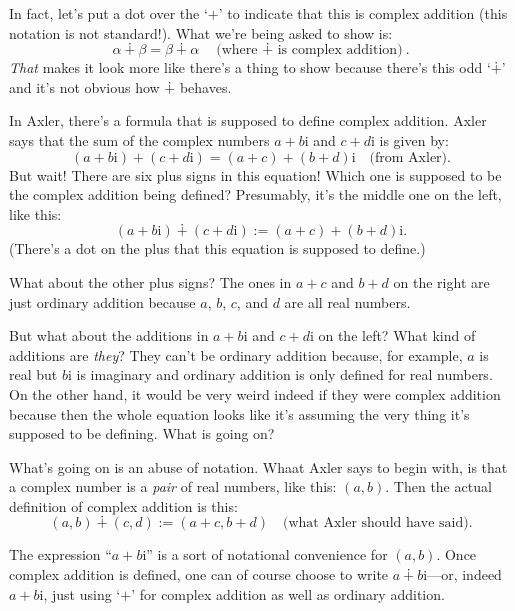 \documentclass[10pt, a4paper, twocolumn]{article}
\newcommand{\ii}{\mathrm{i}}
\begin{document}
In fact, let's put a dot over the `$+$' to indicate that this is complex
addition (this notation is not standard!). What we're being asked to show is:
\begin{equation*}
  \alpha \dotplus \beta = \beta \dotplus \alpha \quad\text{(where $\dotplus$ is complex addition)}.
\end{equation*}
\emph{That} makes it look more like there's a thing to show because there's this odd `$\dotplus$' and it's not obvious how $\dotplus$ behaves.

In Axler, there's a formula that is supposed to define complex addition. Axler says that the sum of the complex numbers $a+b\ii$ and $c+d\ii$ is given by:
\begin{equation*}
  (a + b\ii) + (c + d\ii) = (a+c) + (b+d)\ii \quad\text{(from Axler)}.
\end{equation*}
But wait! There are six plus signs in this equation! Which one is supposed to be the complex addition being defined? Presumably, it's the middle one on the left, like this:
\begin{equation*}
  (a + b\ii) \dotplus (c + d\ii) := (a+c) + (b+d)\ii.
\end{equation*}
(There's a dot on the plus that this equation is supposed to define.)

What about the other plus signs? The ones in $a+c$ and $b+d$ on the right are just ordinary addition because $a$, $b$, $c$, and $d$ are all real numbers. 

But what about the additions in $a+b\ii$ and $c+d\ii$ on the left? What kind of additions are \emph{they}? They can't be ordinary addition because, for example, $a$ is real but $b\ii$ is imaginary and ordinary addition is only defined for real numbers. On the other hand, it would be very weird indeed if they were complex addition because then the whole equation looks like it's assuming the very thing it's supposed to be defining. What is going on?

What's going on is an abuse of notation. Whaat Axler says to begin with,
is that a complex number is a \emph{pair} of real numbers, like this:
$(a, b)$. Then the actual definition of complex addition is this:
\begin{equation*}
  (a, b) \dotplus (c, d) := (a+c, b+d) \quad\text{(what Axler should have said)}.
\end{equation*}

The expression ``$a+b\ii$'' is a sort of notational convenience for
$(a,b)$. Once complex addition is defined, one can of course choose to write $a\dotplus b\ii$---or, indeed $a+b\ii$, just using ‘$+$’ for complex addition as well as ordinary addition. 
\end{document}

